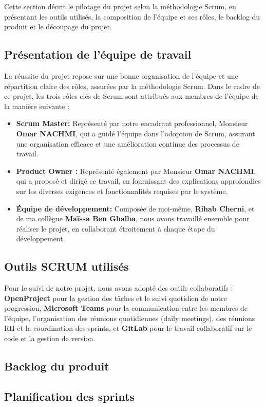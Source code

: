 Cette section décrit le pilotage du projet selon la méthodologie Scrum, en présentant les outils utilisés, la composition de l’équipe et ses rôles, le backlog du produit et le découpage du projet.
\subsection{Présentation de l’équipe de travail }
La réussite du projet repose sur une bonne organisation de l’équipe et une répartition claire des rôles, assurées par la méthodologie Scrum. Dans le cadre de ce projet, les trois rôles clés de Scrum sont attribués aux membres de l’équipe de la manière suivante :
\begin{itemize}[label=$\bullet$]
    \item \textbf{Scrum Master:} Représenté par notre encadrant professionnel, Monsieur \textbf{Omar NACHMI}, qui a guidé l’équipe dans l’adoption de Scrum, assurant une organisation efficace et une amélioration continue des processus de travail.
    \item \textbf{Product Owner :}  Représenté également par Monsieur \textbf{Omar NACHMI}, qui a proposé et dirigé ce travail, en fournissant des explications approfondies sur les diverses exigences et fonctionnalités requises par le système.
    \item \textbf{Équipe de développement:} Composée de moi-même, \textbf{Rihab Cherni}, et de ma collègue \textbf{Maïssa Ben Ghalba}, nous avons travaillé ensemble pour réaliser le projet, en collaborant étroitement à chaque étape du développement.
\end{itemize}
\subsection{Outils SCRUM utilisés}
Pour le suivi de notre projet, nous avons adopté des outils collaboratifs : \textbf{OpenProject} pour la gestion des tâches et le suivi quotidien de notre progression, \textbf{Microsoft Teams} pour la communication entre les membres de l’équipe, l’organisation des réunions quotidiennes (daily meetings), des réunions RH et la coordination des sprints, et \textbf{GitLab} pour le travail collaboratif sur le code et la gestion de version.
 \subsection{Backlog du produit }

\subsection{Planification des sprints}
